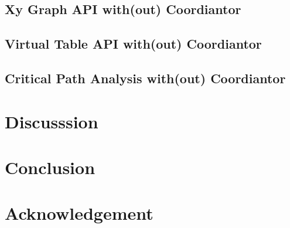 \subsection{Xy Graph API with(out) Coordiantor}

\subsection{Virtual Table API with(out) Coordiantor}

\subsection{Critical Path Analysis with(out) Coordiantor}

\section{Discusssion}

\section{Conclusion}

\section{Acknowledgement}